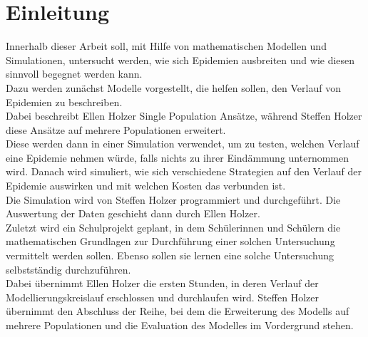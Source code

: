 \section{Einleitung}
\ellen
Innerhalb dieser Arbeit soll, mit Hilfe von mathematischen Modellen und Simulationen, untersucht werden, wie sich Epidemien ausbreiten und wie diesen sinnvoll begegnet werden kann.\\
Dazu werden zunächst Modelle vorgestellt, die helfen sollen, den Verlauf von Epidemien zu beschreiben.\\ 
Dabei beschreibt Ellen Holzer Single Population Ansätze, während Steffen Holzer diese Ansätze auf mehrere Populationen erweitert.\\ 
Diese werden dann in einer Simulation verwendet, um zu testen, welchen Verlauf eine Epidemie nehmen würde, falls nichts zu ihrer Eindämmung unternommen wird. Danach wird simuliert, wie sich verschiedene Strategien auf den Verlauf der Epidemie auswirken und mit welchen Kosten das verbunden ist.\\
Die Simulation wird von Steffen Holzer programmiert und durchgeführt. Die Auswertung der Daten geschieht dann durch Ellen Holzer.\\
Zuletzt wird ein Schulprojekt geplant, in dem Schülerinnen und Schülern die mathematischen Grundlagen zur Durchführung einer solchen Untersuchung vermittelt werden sollen. Ebenso sollen sie lernen eine solche Untersuchung selbstständig durchzuführen.\\
 Dabei übernimmt Ellen Holzer die ersten Stunden, in deren Verlauf der Modellierungskreislauf erschlossen und durchlaufen wird. Steffen Holzer übernimmt den Abschluss der Reihe, bei dem die Erweiterung des Modells auf mehrere Populationen und die Evaluation des Modelles im Vordergrund stehen.  